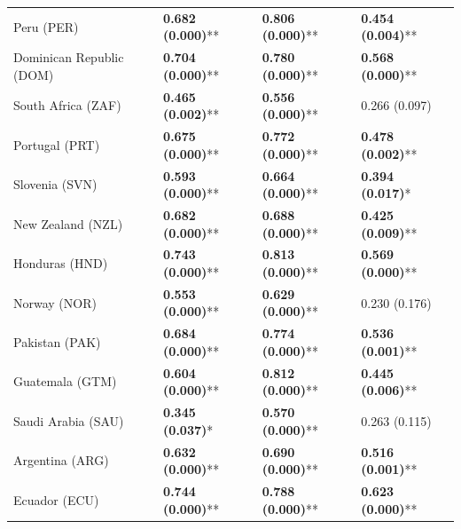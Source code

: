 \begin{longtable}{p{5cm}p{3cm}p{3cm}p{5cm}}
Peru (PER) & \textcolor{atlLime600}{\textbf{0.682 (0.000)}**} & \textcolor{atlLime600}{\textbf{0.806 (0.000)}**} & \textcolor{atlLime600}{\textbf{0.454 (0.004)}**} \\
Dominican Republic (DOM) & \textcolor{atlLime600}{\textbf{0.704 (0.000)}**} & \textcolor{atlLime600}{\textbf{0.780 (0.000)}**} & \textcolor{atlLime600}{\textbf{0.568 (0.000)}**} \\
South Africa (ZAF) & \textcolor{atlLime600}{\textbf{0.465 (0.002)}**} & \textcolor{atlLime600}{\textbf{0.556 (0.000)}**} & \textcolor{atlOrange600}{0.266 (0.097)} \\
Portugal (PRT) & \textcolor{atlLime600}{\textbf{0.675 (0.000)}**} & \textcolor{atlLime600}{\textbf{0.772 (0.000)}**} & \textcolor{atlLime600}{\textbf{0.478 (0.002)}**} \\
Slovenia (SVN) & \textcolor{atlLime600}{\textbf{0.593 (0.000)}**} & \textcolor{atlLime600}{\textbf{0.664 (0.000)}**} & \textcolor{atlLime600}{\textbf{0.394 (0.017)}*} \\
New Zealand (NZL) & \textcolor{atlLime600}{\textbf{0.682 (0.000)}**} & \textcolor{atlLime600}{\textbf{0.688 (0.000)}**} & \textcolor{atlLime600}{\textbf{0.425 (0.009)}**} \\
Honduras (HND) & \textcolor{atlLime600}{\textbf{0.743 (0.000)}**} & \textcolor{atlLime600}{\textbf{0.813 (0.000)}**} & \textcolor{atlLime600}{\textbf{0.569 (0.000)}**} \\
Norway (NOR) & \textcolor{atlLime600}{\textbf{0.553 (0.000)}**} & \textcolor{atlLime600}{\textbf{0.629 (0.000)}**} & \textcolor{atlOrange600}{0.230 (0.176)} \\
Pakistan (PAK) & \textcolor{atlLime600}{\textbf{0.684 (0.000)}**} & \textcolor{atlLime600}{\textbf{0.774 (0.000)}**} & \textcolor{atlLime600}{\textbf{0.536 (0.001)}**} \\
Guatemala (GTM) & \textcolor{atlLime600}{\textbf{0.604 (0.000)}**} & \textcolor{atlLime600}{\textbf{0.812 (0.000)}**} & \textcolor{atlLime600}{\textbf{0.445 (0.006)}**} \\
Saudi Arabia (SAU) & \textcolor{atlLime600}{\textbf{0.345 (0.037)}*} & \textcolor{atlLime600}{\textbf{0.570 (0.000)}**} & \textcolor{atlOrange600}{0.263 (0.115)} \\
Argentina (ARG) & \textcolor{atlLime600}{\textbf{0.632 (0.000)}**} & \textcolor{atlLime600}{\textbf{0.690 (0.000)}**} & \textcolor{atlLime600}{\textbf{0.516 (0.001)}**} \\
Ecuador (ECU) & \textcolor{atlLime600}{\textbf{0.744 (0.000)}**} & \textcolor{atlLime600}{\textbf{0.788 (0.000)}**} & \textcolor{atlLime600}{\textbf{0.623 (0.000)}**} \\

\end{longtable}
